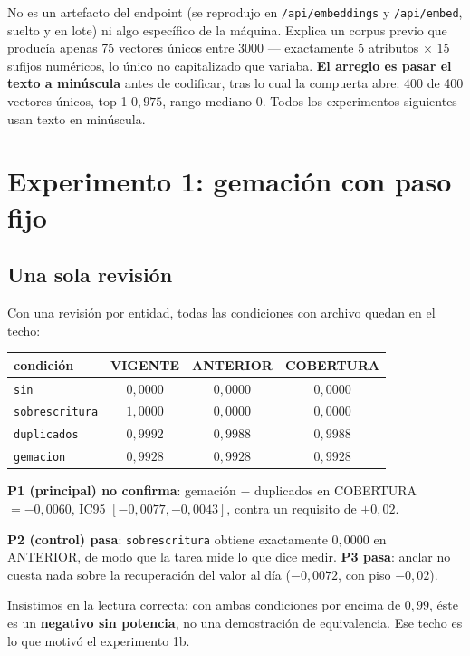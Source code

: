 \documentclass[11pt,a4paper]{article}
\begin{document}
No es un artefacto del endpoint (se reprodujo en \texttt{/api/embeddings} y \texttt{/api/embed},
suelto y en lote) ni algo específico de la máquina. Explica un corpus previo que producía apenas 75
vectores únicos entre 3000 --- exactamente $5$ atributos $\times$ $15$ sufijos numéricos, lo único no
capitalizado que variaba. \textbf{El arreglo es pasar el texto a minúscula} antes de codificar, tras
lo cual la compuerta abre: 400 de 400 vectores únicos, top-1 $0{,}975$, rango mediano $0$. Todos los
experimentos siguientes usan texto en minúscula.

\section{Experimento 1: gemación con paso fijo}
\label{sec:e1}

\subsection{Una sola revisión}

Con una revisión por entidad, todas las condiciones con archivo quedan en el techo:

\begin{center}
\begin{tabular}{lccc}
\toprule
condición & VIGENTE & ANTERIOR & COBERTURA \\
\midrule
\texttt{sin}           & $0{,}0000$ & $0{,}0000$ & $0{,}0000$ \\
\texttt{sobrescritura} & $1{,}0000$ & $0{,}0000$ & $0{,}0000$ \\
\texttt{duplicados}    & $0{,}9992$ & $0{,}9988$ & $0{,}9988$ \\
\texttt{gemacion}      & $0{,}9928$ & $0{,}9928$ & $0{,}9928$ \\
\bottomrule
\end{tabular}
\end{center}

\textbf{P1 (principal) no confirma}: gemación $-$ duplicados en COBERTURA $= -0{,}0060$, IC95
$[-0{,}0077, -0{,}0043]$, contra un requisito de $+0{,}02$.

\textbf{P2 (control) pasa}: \texttt{sobrescritura} obtiene exactamente $0{,}0000$ en ANTERIOR, de modo
que la tarea mide lo que dice medir. \textbf{P3 pasa}: anclar no cuesta nada sobre la recuperación del
valor al día ($-0{,}0072$, con piso $-0{,}02$).

Insistimos en la lectura correcta: con ambas condiciones por encima de $0{,}99$, éste es un
\textbf{negativo sin potencia}, no una demostración de equivalencia. Ese techo es lo que motivó el
experimento 1b.
\end{document}
